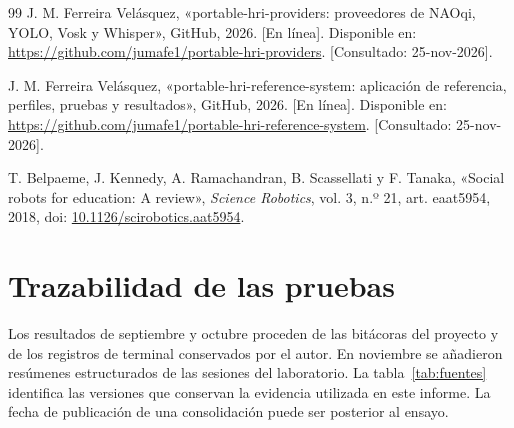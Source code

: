 \documentclass[11pt,letterpaper]{article}
\begin{document}
\begin{thebibliography}{99}
 J. M. Ferreira Velásquez, «portable-hri-providers: proveedores de NAOqi, YOLO, Vosk y Whisper», GitHub, 2026. [En línea]. Disponible en: \url{https://github.com/jumafe1/portable-hri-providers}. [Consultado: 25-nov-2026].

 J. M. Ferreira Velásquez, «portable-hri-reference-system: aplicación de referencia, perfiles, pruebas y resultados», GitHub, 2026. [En línea]. Disponible en: \url{https://github.com/jumafe1/portable-hri-reference-system}. [Consultado: 25-nov-2026].

 T. Belpaeme, J. Kennedy, A. Ramachandran, B. Scassellati y F. Tanaka, «Social robots for education: A review», \emph{Science Robotics}, vol. 3, n.º 21, art. eaat5954, 2018, doi: \href{https://doi.org/10.1126/scirobotics.aat5954}{10.1126/scirobotics.aat5954}.

\end{thebibliography}

\clearpage
\appendix
\section{Trazabilidad de las pruebas}\label{ap:fuentes}
Los resultados de septiembre y octubre proceden de las bitácoras del proyecto y de los registros de terminal conservados por el autor. En noviembre se añadieron resúmenes estructurados de las sesiones del laboratorio. La tabla~\ref{tab:fuentes} identifica las versiones que conservan la evidencia utilizada en este informe. La fecha de publicación de una consolidación puede ser posterior al ensayo.
\end{document}
